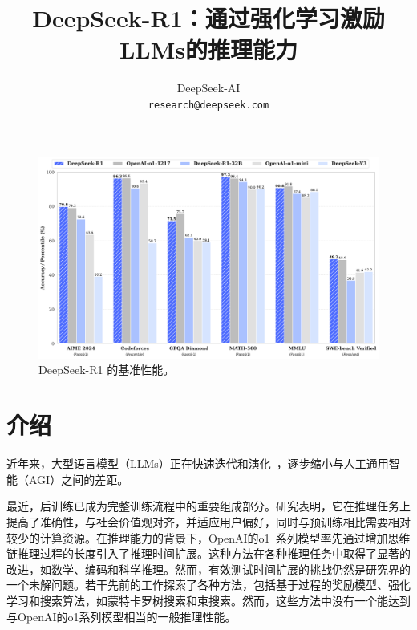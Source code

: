 \documentclass[11pt, a4paper, logo, copyright, nonumbering]{deepseek}
\title{\centering DeepSeek-R1：通过强化学习激励LLMs的推理能力}
\author[*]{
DeepSeek-AI
\\
\small
\texttt{research@deepseek.com}
}
\newcommand{\dsri}{DeepSeek-R1}
\begin{document}
\maketitle
\begin{figure}[h]
\centering
\includegraphics[width=1.0\textwidth]{figures/dsr1_performance.pdf}
\caption{
    \centering
    \dsri{} 的基准性能。
}
\label{fig:dsv3_performance}
\end{figure}

\newpage

\begin{spacing}{0.9}
\tableofcontents
\end{spacing}

\newpage
\section{介绍}
近年来，大型语言模型（LLMs）正在快速迭代和演化~\citep{gpt4o,claude35sonnet,gemini1_5}，逐步缩小与人工通用智能（AGI）之间的差距。

最近，后训练已成为完整训练流程中的重要组成部分。研究表明，它在推理任务上提高了准确性，与社会价值观对齐，并适应用户偏好，同时与预训练相比需要相对较少的计算资源。在推理能力的背景下，OpenAI的o1~\citep{o1}系列模型率先通过增加思维链推理过程的长度引入了推理时间扩展。这种方法在各种推理任务中取得了显著的改进，如数学、编码和科学推理。然而，有效测试时间扩展的挑战仍然是研究界的一个未解问题。若干先前的工作探索了各种方法，包括基于过程的奖励模型\citep{uesato2022solving, lightman2023let,mathshepherd}、强化学习\citep{kumar2024training}和搜索算法，如蒙特卡罗树搜索和束搜索\citep{feng2024alphazeroliketreesearchguidelarge,xin2024deepseekproverv15harnessingproofassistant,AlphaGeometryTrinh2024}。然而，这些方法中没有一个能达到与OpenAI的o1系列模型相当的一般推理性能。
\end{document}
